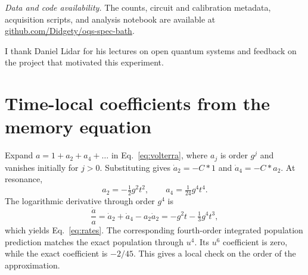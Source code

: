 \documentclass[
    pra,
    showpacs,
    groupedaddress,
    notitlepage,
    floatfix,
    nofootinbib
]{revtex4-2}
\begin{document}
\vspace{1em}
\noindent\textit{Data and code availability.} The counts, circuit and calibration metadata, acquisition scripts, and analysis notebook 
are available at \href{https://github.com/Didgety/oqs-spec-bath}{github.com/Didgety/oqs-spec-bath}.

\begin{acknowledgments}
I thank Daniel Lidar for his lectures on open quantum systems and feedback on the project that motivated this experiment.
\end{acknowledgments}

\appendix
\section{Time-local coefficients from the memory equation}
\label{app:tcl}
Expand $a=1+a_2+a_4+\dots$ in Eq.~\eqref{eq:volterra}, where $a_j$ is order $g^j$ and vanishes initially for $j>0$. 
Substituting gives $\dot a_2=-C*1$ and $\dot a_4=-C*a_2$. At resonance,
\begin{equation}
 a_2=-\tfrac12 g^2t^2,\qquad a_4=\tfrac1{24}g^4t^4 .
\end{equation}
The logarithmic derivative through order $g^4$ is
\begin{equation}
 \frac{\dot a}{a}=\dot a_2+\dot a_4-a_2\dot a_2
                =-g^2t-\tfrac13g^4t^3,
\end{equation}
which yields Eq.~\eqref{eq:rates}. The corresponding fourth-order integrated population prediction matches the exact population through 
$u^4$. Its $u^6$ coefficient is zero, while the exact coefficient is $-2/45$. This gives a local check on the order of the approximation.


\end{document}
